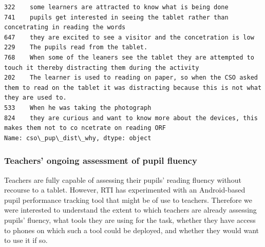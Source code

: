 \documentclass[11pt]{article}
\begin{document}
\begin{Verbatim}[commandchars=\\\{\}]
322    some learners are attracted to know what is being done                                                                                                                                                               
741    pupils get interested in seeing the tablet rather than concetrating in reading the words                                                                                                                             
647    they are excited to see a visitor and the concetration is low                                                                                                                                                        
229    The pupils read from the tablet.                                                                                                                                                                                     
768    When some of the leaners see the tablet they are attempted to touch it thereby distracting them during the activity                                                                                                  
202    The learner is used to reading on paper, so when the CSO asked them to read on the tablet it was distracting because this is not what they are used to.                                                              
533    When he was taking the photograph                                                                                                                                                                                    
824    they are curious and want to know more about the devices, this makes them not to co ncetrate on reading ORF                                                                                                          
Name: cso\_pup\_dist\_why, dtype: object

    \end{Verbatim}

    \hypertarget{teachers-ongoing-assessment-of-pupil-fluency}{%
\subsubsection{Teachers' ongoing assessment of pupil
fluency}\label{teachers-ongoing-assessment-of-pupil-fluency}}

Teachers are fully capable of assessing their pupils' reading fluency
without recourse to a tablet. However, RTI has experimented with an
Android-based pupil performance tracking tool that might be of use to
teachers. Therefore we were interested to understand the extent to which
teachers are already assessing pupils' fluency, what tools they are
using for the task, whether they have access to phones on which such a
tool could be deployed, and whether they would want to use it if so.
\end{document}
